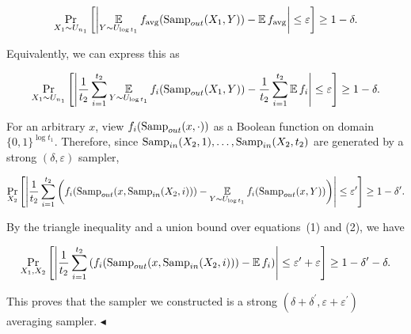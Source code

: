 \[\begin{gathered}
\Pr_{X_{1}\sim U_{n_{1}}}\left[\left|\operatorname*{\mathbb{E}}_{Y\sim U_{\log
t_{1}}}{f_{\text{avg}}(\textup{{Samp}}_{out}(X_{1},Y))}-\operatorname*{\mathbb{E}}f_{\text{avg}}\right|\leq{\varepsilon}\right]\geq 1-\delta.
\end{gathered}\]


Equivalently, we can express this as\par


\[\begin{gathered}
\Pr_{X_{1}\sim U_{n_{1}}}\left[\left|\frac{1}{t_{2}}\sum_{i=1}^{t_{2}}\operatorname*{\mathbb{E}}_{Y\sim U_{\log t_{1}}}{f_{i}(\textup{{Samp}}_{out}(X_{1},Y))}-\frac{1}{t_{2}}\sum_{i=1}^{t_{2}}\operatorname*{\mathbb{E}}f_{i}\right|\leq{\varepsilon}\right]\geq 1-\delta.
\end{gathered}\]




For an arbitrary $x$, view $f_{i}(\textup{{Samp}}_{out}(x,\cdot))$ as a Boolean function on domain $\{0,1\}^{\log t_{1}}$. Therefore, since $\textup{{Samp}}_{in}(X_{2},1),\dots,\textup{{Samp}}_{in}(X_{2},t_{2})$ are generated by a strong $(\delta,\varepsilon)$ sampler,\par


\[\begin{gathered}
\Pr_{X_{2}}\left[{\left|\frac{1}{t_{2}}\sum_{i=1}^{t_{2}}\left(f_{i}(\textup{{Samp}}_{out}(x,\textup{{Samp}}_{in}(X_{2},i)))-\operatorname*{\mathbb{E}}_{Y\sim U_{\log t_{1}}}{f_{i}(\textup{{Samp}}_{out}(x,Y))}\right)\right|\leq{\varepsilon^{\prime}}}\right]\geq 1-{\delta^{\prime}}.
\end{gathered}\]




By the triangle inequality and a union bound over equations (1) and (2), we have\par


\[\begin{gathered}
\Pr_{X_{1},X_{2}}\left[\left|\frac{1}{t_{2}}\sum_{i=1}^{t_{2}}\left(f_{i}(\textup{{Samp}}_{out}(x,\textup{{Samp}}_{in}(X_{2},i)))-\operatorname*{\mathbb{E}}f_{i}\right)\right|\leq\varepsilon^{\prime}+\varepsilon\right]\geq 1-\delta^{\prime}-\delta.
\end{gathered}\]


This proves that the sampler we constructed is a strong $(\delta+\delta^{\prime},\varepsilon+\varepsilon^{\prime})$ averaging sampler.
$\blacktriangleleft$\par




